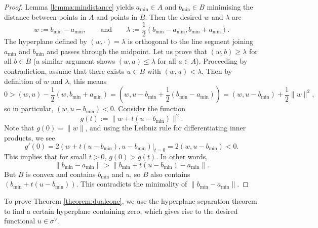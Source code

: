 \documentclass[12pt]{amsart}
\theoremstyle{plain}
\theoremstyle{definition}
\begin{document}
\begin{proof}
Lemma \ref{lemma:mindistance} yields $a_{\text{min}} \in A$ and $b_{\text{min}} \in B$ minimising the distance between points in $A$ and points in $B$.
Then the desired $w$ and $\lambda$ are
$$w := b_{\text{min}} - a_{\text{min}}, \qquad\text{and}\qquad \lambda := \frac{1}{2}(b_{\text{min}} - a_{\text{min}}, b_{\text{min}} + a_{\text{min}}).$$
The hyperplane defined by $(w, \cdot) = \lambda$ is orthogonal to the line segment joining $a_{\text{min}}$ and $b_{\text{min}}$ and passes through the midpoint.
Let us prove that $(w, b) \ge \lambda$ for all $b \in B$ (a similar argument shows $(w, a) \le \lambda$ for all $a \in A$).
Proceeding by contradiction, assume that there exists $u \in B$ with $(w, u) < \lambda$.
Then by definition of $w$ and $\lambda$, this means 
$$0 > (w, u) -\frac{1}{2}(w, b_{\text{min}}+a_{\text{min}}) = (w, u-b_{\text{min}}+\frac{1}{2} (b_{\text{min}}-a_{\text{min}})) =(w, u-b_{\text{min}})+\frac{1}{2}\|w\|^2,$$
so in particular, $(w, u-b_{\text{min}})<0$.
Consider the function
$$g(t):=\|w+t(u-b_{\text{min}})\|^2.$$
Note that $g(0)=\|w\|$, and using the Leibniz rule for differentiating inner products, we see
$$g'(0) = 2 (w+t(u-b_{\text{min}}), u-b_{\text{min}}) \big|_{t=0} = 2 (w, u-b_{\text{min}}) < 0.$$
This implies that for small $t > 0$, $g(0) > g(t)$.
In other words,
$$\|b_{\text{min}} - a_{\text{min}}\| > \|b_{\text{min}} + t(u - b_{\text{min}}) - a_{\text{min}}\|.$$
But $B$ is convex and contains $b_{\text{min}}$ and $u$, so $B$ also contains $(b_{\text{min}} + t (u - b_{\text{min}}))$.
This contradicts the minimality of $\|b_{\text{min}} - a_{\text{min}}\|$.
\end{proof}

To prove Theorem \ref{theorem:dualcone}, we use the hyperplane separation theorem to find a certain hyperplane containing zero, which gives rise to the desired functional $u\in\sigma^\vee$.
\end{document}
